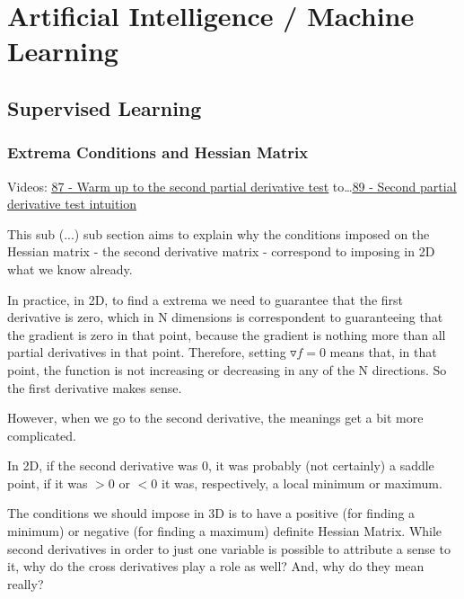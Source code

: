 

\section{Artificial Intelligence / Machine Learning}

\subsection{Supervised Learning}





\subsubsection*{Extrema Conditions and Hessian Matrix}

Videos: \href{https://www.youtube.com/watch?v=nRJM4mY-Pq0&list=PLSQl0a2vh4HC5feHa6Rc5c0wbRTx56nF7&index=87}{\ul{87 - Warm up to the second partial derivative test}} to\dots \href{https://www.youtube.com/watch?v=sJo7D74PAak&list=PLSQl0a2vh4HC5feHa6Rc5c0wbRTx56nF7&index=89}{\ul{89 - Second partial derivative test intuition}}




This sub (...) sub section aims to explain why the conditions imposed on the Hessian matrix - the second derivative matrix - correspond to imposing in 2D what we know already.

In practice, in 2D, to find a extrema we need to guarantee that the first derivative is zero, which in N dimensions is correspondent to guaranteeing that the gradient is zero in that point, because the gradient is nothing more than all partial derivatives in that point. Therefore, setting $\triangledown f = 0$ means that, in that point, the function is not increasing or decreasing in any of the N directions. So the first derivative makes sense.

However, when we go to the second derivative, the meanings get a bit more complicated.

In 2D, if the second derivative was 0, it was probably (not certainly) a saddle point, if it was $> 0$ or $< 0$ it was, respectively, a local minimum or maximum.

The conditions we should impose in 3D is to have a positive (for finding a minimum) or negative (for finding a maximum) definite Hessian Matrix. While second derivatives in order to just one variable is possible to attribute a sense to it, why do the cross derivatives play a role as well? And, why do they mean really?

